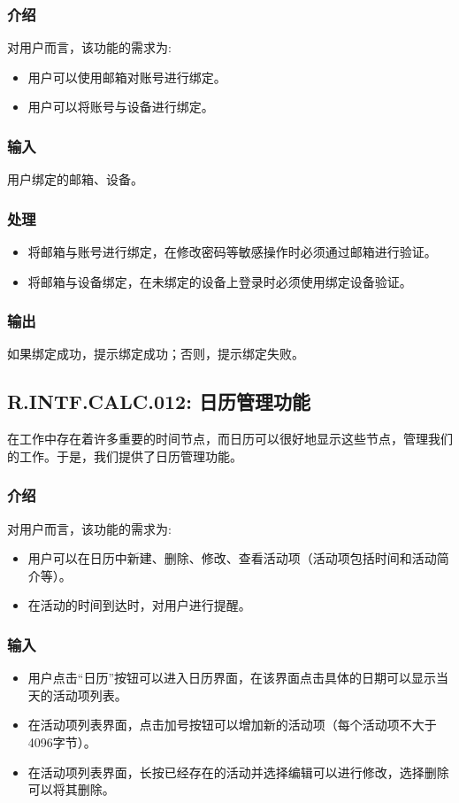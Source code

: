 \subsubsection{介绍}
对用户而言，该功能的需求为:
\begin{itemize}
  \item 用户可以使用邮箱对账号进行绑定。
  \item 用户可以将账号与设备进行绑定。
\end{itemize}
\subsubsection{输入}
用户绑定的邮箱、设备。
\subsubsection{处理}
\begin{itemize}
  \item 将邮箱与账号进行绑定，在修改密码等敏感操作时必须通过邮箱进行验证。
  \item 将邮箱与设备绑定，在未绑定的设备上登录时必须使用绑定设备验证。
\end{itemize}
\subsubsection{输出}
如果绑定成功，提示绑定成功；否则，提示绑定失败。

\subsection{R.INTF.CALC.012: 日历管理功能}
在工作中存在着许多重要的时间节点，而日历可以很好地显示这些节点，管理我们的工作。于是，我们提供了日历管理功能。
\subsubsection{介绍}
对用户而言，该功能的需求为:
\begin{itemize}
  \item 用户可以在日历中新建、删除、修改、查看活动项（活动项包括时间和活动简介等）。
  \item 在活动的时间到达时，对用户进行提醒。
\end{itemize}
\subsubsection{输入}
\begin{itemize}
  \item 用户点击“日历”按钮可以进入日历界面，在该界面点击具体的日期可以显示当天的活动项列表。
  \item 在活动项列表界面，点击加号按钮可以增加新的活动项（每个活动项不大于4096字节）。
  \item 在活动项列表界面，长按已经存在的活动并选择编辑可以进行修改，选择删除可以将其删除。
\end{itemize}
